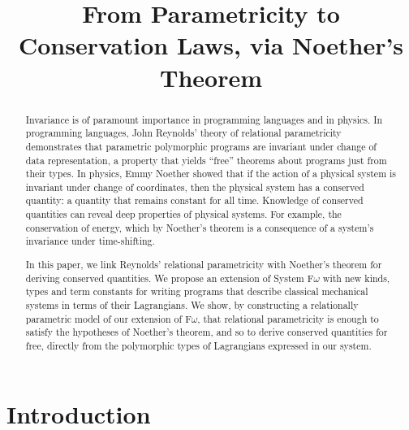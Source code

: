 \documentclass[preprint]{sigplanconf}
\title{From Parametricity to Conservation Laws, via Noether's Theorem}
\theoremstyle{examplestyle}
\begin{document}
\maketitle

\begin{abstract}
  Invariance is of paramount importance in programming languages and
  in physics. In programming languages, John Reynolds' theory of
  relational parametricity demonstrates that parametric polymorphic
  programs are invariant under change of data representation, a
  property that yields ``free'' theorems about programs just from
  their types. In physics, Emmy Noether showed that if the action of a
  physical system is invariant under change of coordinates, then the
  physical system has a conserved quantity: a quantity that remains
  constant for all time. Knowledge of conserved quantities can reveal
  deep properties of physical systems. For example, the conservation
  of energy, which by Noether's theorem is a consequence of a system's
  invariance under time-shifting.

  In this paper, we link Reynolds' relational parametricity with
  Noether's theorem for deriving conserved quantities. We propose an
  extension of System F$\omega$ with new kinds, types and term
  constants for writing programs that describe classical mechanical
  systems in terms of their Lagrangians. We show, by constructing a
  relationally parametric model of our extension of F$\omega$, that
  relational parametricity is enough to satisfy the hypotheses of
  Noether's theorem, and so to derive conserved quantities for free,
  directly from the polymorphic types of Lagrangians expressed in our
  system.
\end{abstract}

\section{Introduction}
\end{document}
